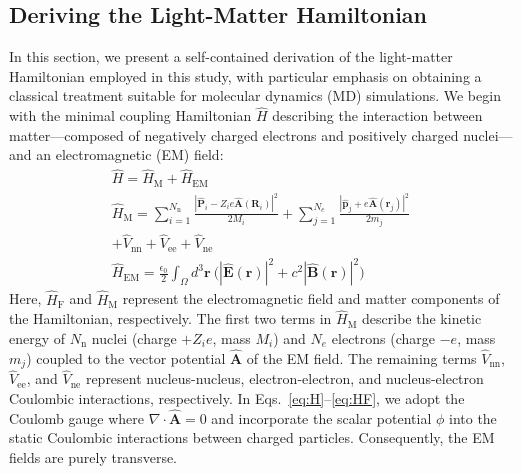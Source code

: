 \documentclass[%
 reprint,
 amsmath,amssymb,
 aps,
]{revtex4-2}
\begin{document}
\subsection{Deriving the Light-Matter Hamiltonian}\label{app:hamiltonian}

In this section, we present a self-contained derivation of the light-matter Hamiltonian employed in this study, with particular emphasis on obtaining a classical treatment suitable for molecular dynamics (MD) simulations.
We begin with the minimal coupling Hamiltonian $\hat{H}$ describing the interaction between matter---composed of negatively charged electrons and positively charged nuclei---and an electromagnetic (EM) field:
\begin{gather}
\hat{H} = \hat{H}_\mathrm{M}+\hat{H}_\mathrm{EM} \label{eq:H}
\\
\hat{H}_\mathrm{M} = \sum_{i=1}^{N_\mathrm{n}} \frac{| \hat{\bm P}_i -Z_i e \hat{\bm A}(\bm R_i)|^2}{2 M_i} + \sum_{j=1}^{N_e} \frac{| \hat{\bm p}_j +e \hat{\bm A}(\bm r_j)|^2}{2 m_j} \nonumber
\\
+ \hat{V}_\mathrm{nn}+ \hat{V}_\mathrm{ee}+ \hat{V}_\mathrm{ne} \label{eq:HM}
\\
\hat{H}_\mathrm{EM} = \frac{\epsilon_0}{2}\int_\Omega d^3 \bm r  \ \big( | \hat{\bm E}(\bm r)|^2+c^2 | \hat{\bm  B}(\bm r)|^2 \big) \label{eq:HF}
\end{gather}
Here, $\hat{H}_\mathrm{F}$ and $\hat{H}_\mathrm{M}$ represent the electromagnetic field and matter components of the Hamiltonian, respectively.
The first two terms in $\hat{H}_\mathrm{M}$ describe the kinetic energy of $N_\mathrm{n}$ nuclei (charge $+Z_i e$, mass $M_i$) and $N_e$ electrons (charge $-e$, mass $m_j$) coupled to the vector potential $\hat{\bm A}$ of the EM field.
The remaining terms $\hat{V}_\mathrm{nn}$, $\hat{V}_\mathrm{ee}$, and $\hat{V}_\mathrm{ne}$ represent nucleus-nucleus, electron-electron, and nucleus-electron Coulombic interactions, respectively.
In Eqs.~\eqref{eq:H}--\eqref{eq:HF}, we adopt the Coulomb gauge where $\nabla \cdot \hat{\bm A} = 0$ and incorporate the scalar potential $\phi$ into the static Coulombic interactions between charged particles.
Consequently, the EM fields are purely transverse.
\end{document}
